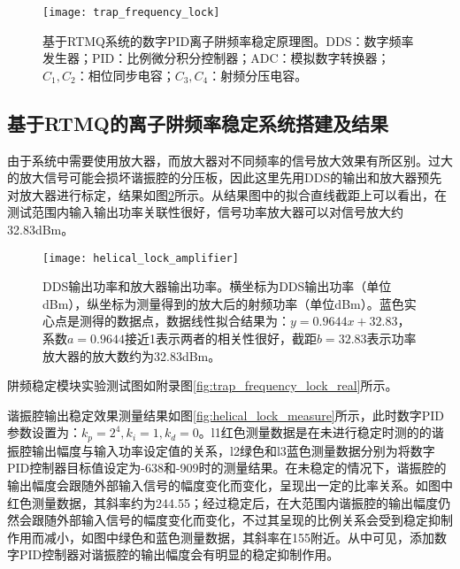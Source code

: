\begin{figure}
    \centering
    \caption[数字PID离子阱频率稳定原理图]{基于RTMQ系统的数字PID离子阱频率稳定原理图。DDS：数字频率发生器；PID：比例微分积分控制器；ADC：模拟数字转换器；$C_1,C_2$：相位同步电容；$C_3,C_4$：射频分压电容。\label{fig:trap_frequency_lock}}
    \texttt{[image: trap\_frequency\_lock]}
\end{figure}


\subsection[基于RTMQ的离子阱频率稳定系统搭建及结果]{基于RTMQ的离子阱频率稳定系统搭建及结果}

由于系统中需要使用放大器，而放大器对不同频率的信号放大效果有所区别。过大的放大信号可能会损坏谐振腔的分压板，因此这里先用DDS的输出和放大器预先对放大器进行标定，结果如图\ref{fig:helical_lock_amplifier}所示。从结果图中的拟合直线截距上可以看出，在测试范围内输入输出功率关联性很好，信号功率放大器可以对信号放大约32.83dBm。

\begin{figure}
    \centering
    \caption[DDS输出功率和放大器输出功率]{DDS输出功率和放大器输出功率。横坐标为DDS输出功率（单位dBm），纵坐标为测量得到的放大后的射频功率（单位dBm）。蓝色实心点是测得的数据点，数据线性拟合结果为：$y=0.9644x+32.83$，系数$a=0.9644$接近1表示两者的相关性很好，截距$b=32.83$表示功率放大器的放大数约为32.83dBm。\label{fig:helical_lock_amplifier}}
    \texttt{[image: helical\_lock\_amplifier]}
\end{figure}

阱频稳定模块实验测试图如附录图\ref{fig:trap_frequency_lock_real}所示。



谐振腔输出稳定效果测量结果如图\ref{fig:helical_lock_measure}所示，此时数字PID参数设置为：$k_p=2^4,k_i=1,k_d=0$。l1红色测量数据是在未进行稳定时测的的谐振腔输出幅度与输入功率设定值的关系，l2绿色和l3蓝色测量数据分别为将数字PID控制器目标值设定为-638和-909时的测量结果。在未稳定的情况下，谐振腔的输出幅度会跟随外部输入信号的幅度变化而变化，呈现出一定的比率关系。如图中红色测量数据，其斜率约为244.55；经过稳定后，在大范围内谐振腔的输出幅度仍然会跟随外部输入信号的幅度变化而变化，不过其呈现的比例关系会受到稳定抑制作用而减小，如图中绿色和蓝色测量数据，其斜率在155附近。从中可见，添加数字PID控制器对谐振腔的输出幅度会有明显的稳定抑制作用。


